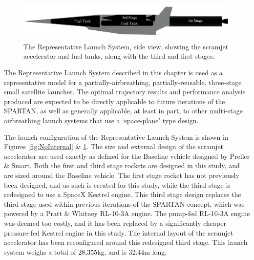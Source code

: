 {\begin{figure}[ht]
		 	\centering
		 	\includegraphics[width=0.85\linewidth]{figures/3_vehicle_design/INTERNALS}
		 	\caption{The Representative Launch System, side view, showing the scramjet accelerator and fuel tanks, along with the third and first stages. }
		 	\label{fig:INTERNALS}
		 \end{figure}
	The Representative Launch System described in this chapter is used as a representative model for a partially-airbreathing, partially-reusable, three-stage small satellite launcher. The optimal trajectory results and performance analysis produced are expected to be directly applicable to future iterations of the SPARTAN, as well as generally applicable, at least in part, to other multi-stage airbreathing launch systems that use a `space-plane' type design. }
	
	 The launch configuration of the Representative Launch System is shown in Figures \ref{fig:NoInternal} \& \ref{fig:INTERNALS}. 
	 The size and external design of the scramjet accelerator are used exactly as defined for the Baseline vehicle designed by Preller \& Smart\cite{Preller2017b}. Both the first and third stage rockets are designed in this study, and are sized around the Baseline vehicle. 
	 The first stage rocket has not previously been designed, and as such is created for this study, while the third stage is redesigned to use a SpaceX Kestrel engine. This third stage design replaces the third stage used within previous iterations of the SPARTAN concept, which was powered by a Pratt \& Whitney RL-10-3A engine\cite{Preller2017b}. The pump-fed RL-10-3A engine was deemed too costly, and it has been replaced by a significantly cheaper pressure-fed Kestrel engine in this study.  
	 The internal layout of the scramjet accelerator has been reconfigured around this redesigned third stage. 
	 This launch system weighs a total of \textcolor{black}{28,355}kg, and is 32.44m long. 
	 

